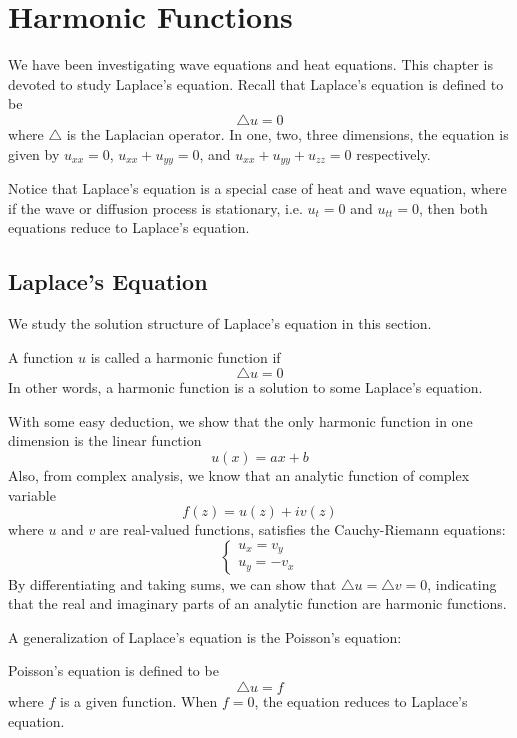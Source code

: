 \chapter{Harmonic Functions}

We have been investigating wave equations and heat equations. This chapter is devoted to study Laplace's equation. Recall that Laplace's equation is defined to be 
\[\triangle u = 0\]
where $\triangle$ is the Laplacian operator. In one, two, three dimensions, the equation is given by $u_{xx} = 0$, $u_{xx} + u_{yy}=0$, and $u_{xx} + u_{yy} + u_{zz}=0$ respectively. 

Notice that Laplace's equation is a special case of heat and wave equation, where if the wave or diffusion process is stationary, i.e. $u_t=0$ and $u_{tt}=0$, then both equations reduce to Laplace's equation. 

\section{Laplace's Equation}
We study the solution structure of Laplace's equation in this section.

\medskip

\begin{defn} 
    A function $u$ is called a harmonic function if 
    \[\triangle u = 0\]
    In other words, a harmonic function is a solution to some Laplace's equation.
\end{defn}

With some easy deduction, we show that the only harmonic function in one dimension is the linear function 
\[ u(x) = ax + b\]
Also, from complex analysis, we know that an analytic function of complex variable 
\[f(z) = u(z) + iv(z)\]
where $u$ and $v$ are real-valued functions, satisfies the Cauchy-Riemann equations:
\[\begin{cases}
    u_x = v_y \\
    u_y = -v_x
\end{cases}\]
By differentiating and taking sums, we can show that $\triangle u = \triangle v = 0$, indicating that the real and imaginary parts of an analytic function are harmonic functions. 

A generalization of Laplace's equation is the Poisson's equation:

\medskip

\begin{defn} 
    Poisson's equation is defined to be 
    \[\triangle u = f\]
    where $f$ is a given function. When $f=0$, the equation reduces to Laplace's equation.
\end{defn}

